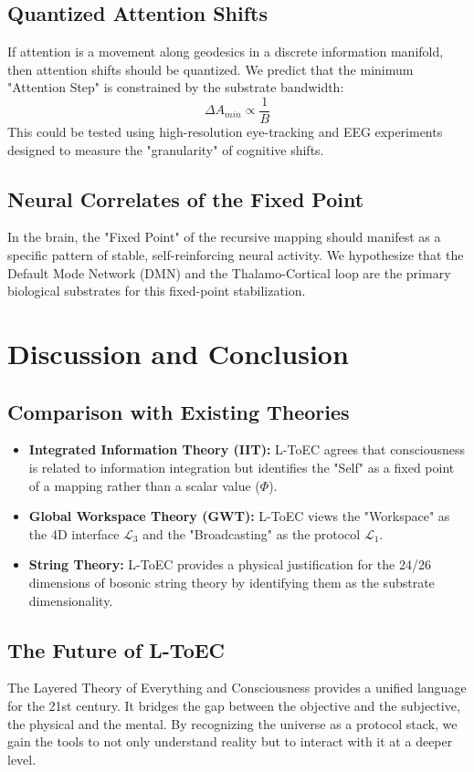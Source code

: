 \documentclass[11pt,onecolumn]{article}
\newcommand{\protocol}{\mathcal{L}_1}
\newcommand{\interface}{\mathcal{L}_3}
\begin{document}
\subsection{Quantized Attention Shifts}
If attention is a movement along geodesics in a discrete information manifold, then attention shifts should be quantized. We predict that the minimum "Attention Step" is constrained by the substrate bandwidth:
\begin{equation}
\Delta A_{min} \propto \frac{1}{B}
\end{equation}
This could be tested using high-resolution eye-tracking and EEG experiments designed to measure the "granularity" of cognitive shifts.

\subsection{Neural Correlates of the Fixed Point}
In the brain, the "Fixed Point" of the recursive mapping should manifest as a specific pattern of stable, self-reinforcing neural activity. We hypothesize that the Default Mode Network (DMN) and the Thalamo-Cortical loop are the primary biological substrates for this fixed-point stabilization.

\section{Discussion and Conclusion}

\subsection{Comparison with Existing Theories}
\begin{itemize}
    \item \textbf{Integrated Information Theory (IIT):} L-ToEC agrees that consciousness is related to information integration but identifies the "Self" as a fixed point of a mapping rather than a scalar value ($\Phi$).
    \item \textbf{Global Workspace Theory (GWT):} L-ToEC views the "Workspace" as the 4D interface $\interface$ and the "Broadcasting" as the protocol $\protocol$.
    \item \textbf{String Theory:} L-ToEC provides a physical justification for the 24/26 dimensions of bosonic string theory by identifying them as the substrate dimensionality.
\end{itemize}

\subsection{The Future of L-ToEC}
The Layered Theory of Everything and Consciousness provides a unified language for the 21st century. It bridges the gap between the objective and the subjective, the physical and the mental. By recognizing the universe as a protocol stack, we gain the tools to not only understand reality but to interact with it at a deeper level.
\end{document}
